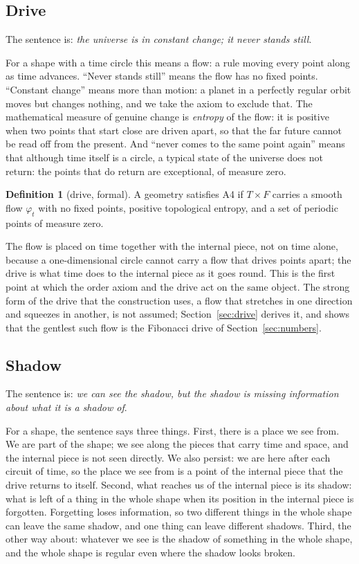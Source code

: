 \documentclass[11pt,a4paper]{article}
\theoremstyle{plain}
\theoremstyle{definition}
\newtheorem{definition}[theorem]{Definition}
\theoremstyle{remark}
\begin{document}
\subsection{Drive}\label{sec:A4}

The sentence is: \emph{the universe is in constant change; it never stands still}.

For a shape with a time circle this means a flow: a rule moving every point along as time advances. ``Never stands still'' means the flow has no fixed points. ``Constant change'' means more than motion: a planet in a perfectly regular orbit moves but changes nothing, and we take the axiom to exclude that. The mathematical measure of genuine change is \emph{entropy} of the flow: it is positive when two points that start close are driven apart, so that the far future cannot be read off from the present. And ``never comes to the same point again'' means that although time itself is a circle, a typical state of the universe does not return: the points that do return are exceptional, of measure zero.

\begin{definition}[drive, formal]\label{def:A4}
A geometry satisfies A4 if $T\times F$ carries a smooth flow $\varphi_{t}$ with no fixed points, positive topological entropy, and a set of periodic points of measure zero.
\end{definition}

The flow is placed on time together with the internal piece, not on time alone, because a one-dimensional circle cannot carry a flow that drives points apart; the drive is what time does to the internal piece as it goes round. This is the first point at which the order axiom and the drive act on the same object. The strong form of the drive that the construction uses, a flow that stretches in one direction and squeezes in another, is not assumed; Section~\ref{sec:drive} derives it, and shows that the gentlest such flow is the Fibonacci drive of Section~\ref{sec:numbers}.

\subsection{Shadow}\label{sec:A5}

The sentence is: \emph{we can see the shadow, but the shadow is missing information about what it is a shadow of}.

For a shape, the sentence says three things. First, there is a place we see from. We are part of the shape; we see along the pieces that carry time and space, and the internal piece is not seen directly. We also persist: we are here after each circuit of time, so the place we see from is a point of the internal piece that the drive returns to itself. Second, what reaches us of the internal piece is its shadow: what is left of a thing in the whole shape when its position in the internal piece is forgotten. Forgetting loses information, so two different things in the whole shape can leave the same shadow, and one thing can leave different shadows. Third, the other way about: whatever we see is the shadow of something in the whole shape, and the whole shape is regular even where the shadow looks broken.
\end{document}
